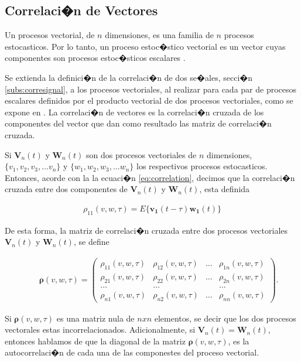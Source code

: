 \subsection{Correlaci�n de Vectores}\label{subs:correvector}

Un procesos vectorial, de $n$ dimensiones, es una familia de $n$ procesos
estocasticos. Por lo tanto, un proceso estoc�stico vectorial es un
vector cuyas componentes son procesos estoc�sticos escalares \cite{Requena08}. 

Se extienda la definici�n de la correlaci�n de dos se�ales, secci�n
\ref{subs:corresignal}, a los procesos vectoriales, al realizar para cada par de
procesos escalares  definidos por el producto vectorial de dos procesos
vectoriales, como se expone en \cite{Requena08}. La correlaci�n de vectores es la correlaci�n cruzada de los
componentes del vector que dan como resultado las matriz de correlaci�n
cruzada.

Si $\mathbf{V}_n(t)$ y $\mathbf{W}_n(t)$ son dos procesos vectoriales  de $n$
dimensiones, $\{v_1, v_2, v_3, \ldots v_n\}$ y  $\{w_1, w_2, w_3, \ldots
w_n\}$ los respectivos procesos estocasticos. Entonces, acorde con la
la ecuaci�n \ref{eq:correlation}, decimos que la correlaci�n cruzada entre dos
componentes de $\mathbf{V}_n(t)$ y $\mathbf{W}_n(t)$, esta definida 

 \begin{eqnarray}\label{eq:correlationCompVector}
 {\rho_{11}}(v,w,\tau)=E{\{ \mathbf{v_1}(t-\tau)\mathbf{w_1}(t) \}}
 \end{eqnarray}

De esta forma, la matriz de correlaci�n cruzada entre dos procesos vectoriales
$\mathbf{V}_n(t)$ y $\mathbf{W}_n(t)$, se define 

 \begin{eqnarray}\label{eq:correlationVector}
 &&\boldsymbol{\rho}(v,w,\tau)
 = \left( \begin{array}{cccc}
 {\rho}_{11}(v,w,\tau) & {\rho}_{12}(v,w,\tau) & \ldots &{\rho}_{1n}(v,w,\tau)\\
 {\rho}_{21}(v,w,\tau) & {\rho}_{22}(v,w,\tau) & \ldots &{\rho}_{2n}(v,w,\tau)\\
 \ldots & \ldots& & \ldots\\
 {\rho}_{n1}(v,w,\tau) & {\rho}_{n2}(v,w,\tau) & \ldots &{\rho}_{nn}(v,w,\tau) 
 \end{array} \right).
 \end{eqnarray}
 

Si  $\boldsymbol{\rho}(v,w,\tau)$  es una matriz  nula de $nxn$ elementos, se
decir que los dos procesos vectorales estas incorrelacionados. Adicionalmente,
si $\mathbf{V}_n(t) = \mathbf{W}_n(t)$, entonces hablamos de que la diagonal de la
matriz $\boldsymbol{\rho}(v,w,\tau)$, es la autocorrelaci�n de cada una de las
componestes del  proceso vectorial.


